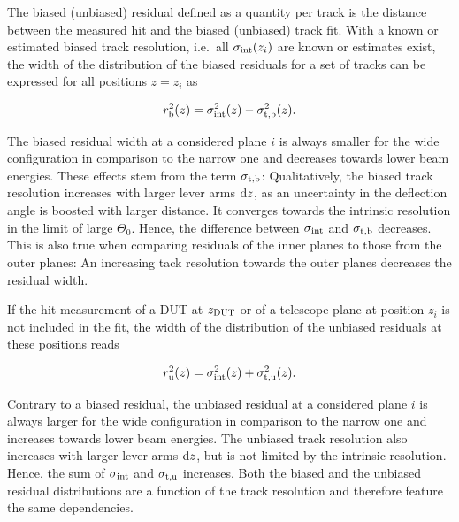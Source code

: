 The biased (unbiased) residual defined as a quantity per track is the distance between the measured hit and the biased (unbiased) track fit. 
With a known or estimated biased track resolution, i.e.\ all $\sigma_{\textrm{int}}(z_i)$ are known or estimates exist,
 the width of the distribution of the \textrm{biased} residuals for a set of tracks can be expressed for all positions $z = z_i$ as

\begin{equation}
 \label{eq:telescoperesolutionequation1}
 r_{\textrm{b}}^2(z) = \sigma_{\textrm{int}}^2(z) - \sigma_{\textrm{t,b}}^2(z).
\end{equation}

\noindent
The biased residual width at a considered plane $i$ is always smaller for the wide configuration in comparison to the narrow one and decreases towards lower beam energies. 
These effects stem from the term $\sigma_{\textrm{t,b}}$: 
Qualitatively, the biased track resolution increases with larger lever arms $\textrm{d}z$, as an uncertainty in the deflection angle is boosted with larger distance. 
It converges towards the intrinsic resolution in the limit of large $\Theta_0$. 
Hence, the difference between $\sigma_{\textrm{int}}$ and $\sigma_{\textrm{t,b}}$ decreases. 
This is also true when comparing residuals of the inner planes to those from the outer planes:
An increasing tack resolution towards the outer planes decreases the residual width. 

If the hit measurement of a DUT at $z_{\textrm{DUT}}$ or of a telescope plane at position $z_i$ is not included in the fit,
 the width of the distribution of the \textrm{unbiased} residuals at these positions reads~\cite{ref:eudetreport200902}
 
\begin{equation}
r_{\textrm{u}}^2(z) = \sigma_{\textrm{int}}^2(z) + \sigma_{\textrm{t,u}}^2(z).
\label{eq:telescoperesolutionequation2} 
\end{equation}

\noindent
Contrary to a biased residual, the unbiased residual at a considered plane $i$ is always larger for the wide configuration in comparison to the narrow one and increases towards lower beam energies. 
The unbiased track resolution also increases with larger lever arms $\textrm{d}z$, but is not limited by the intrinsic resolution. 
Hence, the sum of $\sigma_{\textrm{int}}$ and $\sigma_{\textrm{t,u}}$ increases. 
Both the biased and the unbiased residual distributions are a function of the track resolution and therefore feature the same dependencies.


